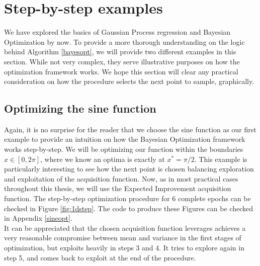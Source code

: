 \documentclass[10pt,a4paper,twoside]{book}
\begin{document}
\section{Step-by-step examples}

We have explored the basics of Gaussian Process regression and Bayesian Optimization by now. To provide a more thorough understanding on the logic behind Algorithm \ref{bayesopt}, we will provide two different examples in this section. While not very complex, they serve illustrative purposes on how the optimization framework works. We hope this section will clear any practical consideration on how the procedure selects the next point to sample, graphically.

\subsection{Optimizing the sine function}

Again, it is no surprise for the reader that we choose the sine function as our first example to provide an intuition on how the Bayesian Optimization framework works step-by-step. We will be optimizing our function within the boundaries $x \in [0, 2\pi]$, where we know an optima is exactly at $x^* = \pi/2$. This example is particularly interesting to see how the next point is chosen balancing exploration and exploitation of the acquisition function. Now, as in most practical cases throughout this thesis, we will use the Expected Improvement acquisition function. The step-by-step optimization procedure for 6 complete epochs can be checked in Figure \ref{fig:1dstep}. The code to produce these Figures can be checked in Appendix \ref{sineopt}.\\

It can be appreciated that the chosen acquisition function leverages achieves a very reasonable compromise between mean and variance in the first stages of optimization, but exploits heavily in steps 3 and 4. It tries to explore again in step 5, and comes back to exploit at the end of the procedure.
\end{document}
